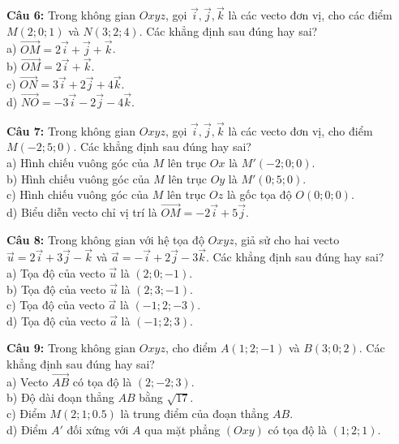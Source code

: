 \documentclass[12pt]{article}
\begin{document}
	\noindent \textbf{Câu 6:} Trong không gian $Oxyz$, gọi $\vec{i}, \vec{j}, \vec{k}$ là các vecto đơn vị, cho các điểm $M(2;0;1)$ và $N(3;2;4)$. Các khẳng định sau đúng hay sai? \\
	\noindent a) $\vec{OM} = 2\vec{i} + \vec{j} + \vec{k}$. \\
	\noindent b) $\vec{OM} = 2\vec{i} + \vec{k}$. \\
	\noindent c) $\vec{ON} = 3\vec{i} + 2\vec{j} + 4\vec{k}$. \\
	\noindent d) $\vec{NO} = -3\vec{i} - 2\vec{j} - 4\vec{k}$.
	
	\vspace{4mm}
	\noindent \textbf{Câu 7:} Trong không gian $Oxyz$, gọi $\vec{i}, \vec{j}, \vec{k}$ là các vecto đơn vị, cho điểm $M(-2;5;0)$. Các khẳng định sau đúng hay sai? \\
	\noindent a) Hình chiếu vuông góc của $M$ lên trục $Ox$ là $M'(-2;0;0)$. \\
	\noindent b) Hình chiếu vuông góc của $M$ lên trục $Oy$ là $M'(0;5;0)$. \\
	\noindent c) Hình chiếu vuông góc của $M$ lên trục $Oz$ là gốc tọa độ $O(0;0;0)$. \\
	\noindent d) Biểu diễn vecto chỉ vị trí là $\vec{OM} = -2\vec{i} + 5\vec{j}$.
	
	\vspace{4mm}
	\noindent \textbf{Câu 8:} Trong không gian với hệ tọa độ $Oxyz$, giả sử cho hai vecto $\vec{u} = 2\vec{i} + 3\vec{j} - \vec{k}$ và $\vec{a} = -\vec{i} + 2\vec{j} - 3\vec{k}$. Các khẳng định sau đúng hay sai? \\
	\noindent a) Tọa độ của vecto $\vec{u}$ là $(2; 0; -1)$. \\
	\noindent b) Tọa độ của vecto $\vec{u}$ là $(2; 3; -1)$. \\
	\noindent c) Tọa độ của vecto $\vec{a}$ là $(-1; 2; -3)$. \\
	\noindent d) Tọa độ của vecto $\vec{a}$ là $(-1; 2; 3)$.
	
	\vspace{4mm}
	\noindent \textbf{Câu 9:} Trong không gian $Oxyz$, cho điểm $A(1; 2; -1)$ và $B(3; 0; 2)$. Các khẳng định sau đúng hay sai? \\
	\noindent a) Vecto $\vec{AB}$ có tọa độ là $(2; -2; 3)$. \\
	\noindent b) Độ dài đoạn thẳng $AB$ bằng $\sqrt{17}$. \\
	\noindent c) Điểm $M(2; 1; 0.5)$ là trung điểm của đoạn thẳng $AB$. \\
	\noindent d) Điểm $A'$ đối xứng với $A$ qua mặt phẳng $(Oxy)$ có tọa độ là $(1; 2; 1)$.
	
\end{document}
